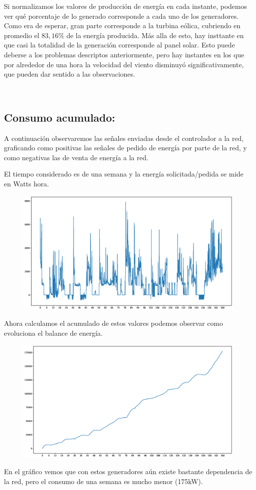 Si normalizamos los valores de producción de energía en cada instante,
podemos ver qué porcentaje de lo generado corresponde a cada uno de los
generadores. Como era de esperar, gran parte corresponde a la turbina
eólica, cubriendo en promedio el \(83,16\%\) de la energía producida.
Más alla de esto, hay insttante en que casi la totalidad de la
generación corresponde al panel solar. Esto puede deberse a los
problemas descriptos anteriormente, pero hay instantes en los que por
alrededor de una hora la velocidad del viento disminuyó
significativamente, que pueden dar sentido a las observaciones.

    \begin{center}
    \end{center}
    { \hspace*{\fill} \\}


\subsection{Consumo acumulado:}
A continuación observaremos las señales enviadas desde el controlador a la red, graficando
como positivas las señales de pedido de energía por parte de la red, y como negativas las
de venta de energía a la red.

El tiempo considerado es de una semana y la energía solicitada/pedida se mide en Watts hora.

\begin{figure}[H]
    \centering
    \includegraphics[scale=0.3]{images/cons.eps}
\end{figure}

Ahora calculamos el acumulado de estos valores podemos observar como evoluciona el
balance de energía. 

\begin{figure}[H]
    \centering
    \includegraphics[scale=0.3]{images/acc.eps}
\end{figure}

En el gráfico vemos que con estos generadores aún existe bastante dependencia de la red,
pero el consumo de una semana es mucho menor (175kW).